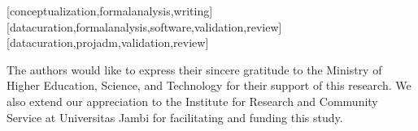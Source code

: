 \documentclass[english]{textolivre}
\begin{document}
\printbibliography\label{sec-bib}


\begin{contributors}
[conceptualization,formalanalysis,writing]
[datacuration,formalanalysis,software,validation,review]
[datacuration,projadm,validation,review]
\end{contributors}

\begin{dataavailability}
\end{dataavailability}

\begin{funding}
The authors would like to express their sincere gratitude to the Ministry of Higher Education, Science, and Technology for their support of this research. We also extend our appreciation to the Institute for Research and Community Service at Universitas Jambi for facilitating and funding this study.
\end{funding}
\end{document}
